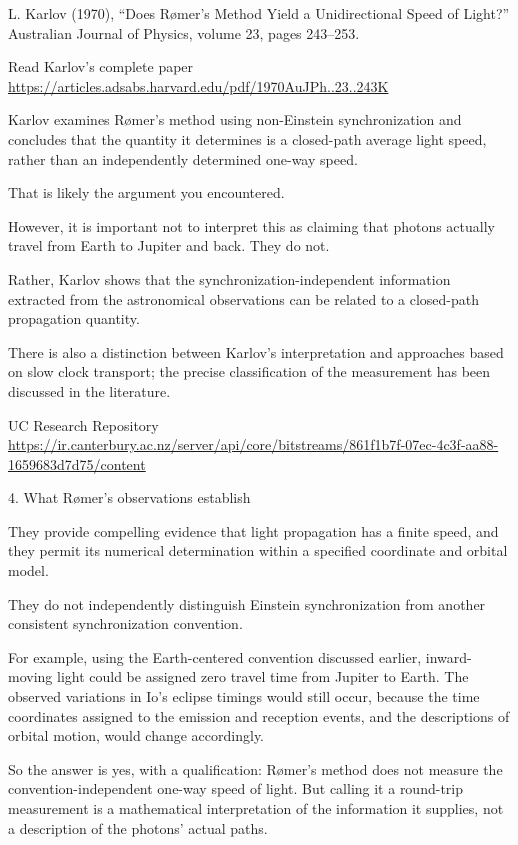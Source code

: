 \documentclass[a4paper]{article}
\theoremstyle{plain}
\theoremstyle{definition}
\begin{document}
L. Karlov (1970), “Does R\o{}mer's Method Yield a Unidirectional Speed
of Light?” Australian Journal of Physics, volume 23, pages 243–253.

Read Karlov's complete paper
\url{https://articles.adsabs.harvard.edu/pdf/1970AuJPh..23..243K}

Karlov examines R\o{}mer's method using non-Einstein synchronization
and concludes that the quantity it determines is a closed-path average
light speed, rather than an independently determined one-way speed.

That is likely the argument you encountered.

However, it is important not to interpret this as claiming that
photons actually travel from Earth to Jupiter and back.  They do not.

Rather, Karlov shows that the synchronization-independent information
extracted from the astronomical observations can be related to a
closed-path propagation quantity.

There is also a distinction between Karlov's interpretation and
approaches based on slow clock transport; the precise classification
of the measurement has been discussed in the literature.

UC Research Repository
\url{https://ir.canterbury.ac.nz/server/api/core/bitstreams/861f1b7f-07ec-4c3f-aa88-1659683d7d75/content}

4. What R\o{}mer's observations establish

They provide compelling evidence that light propagation has a finite
speed, and they permit its numerical determination within a specified
coordinate and orbital model.

They do not independently distinguish Einstein synchronization from
another consistent synchronization convention.

For example, using the Earth-centered convention discussed earlier,
inward-moving light could be assigned zero travel time from Jupiter to
Earth. The observed variations in Io's eclipse timings would still
occur, because the time coordinates assigned to the emission and
reception events, and the descriptions of orbital motion, would change
accordingly.

So the answer is yes, with a qualification: Rømer's method does not
measure the convention-independent one-way speed of light. But calling
it a round-trip measurement is a mathematical interpretation of the
information it supplies, not a description of the photons' actual
paths.
\end{document}

